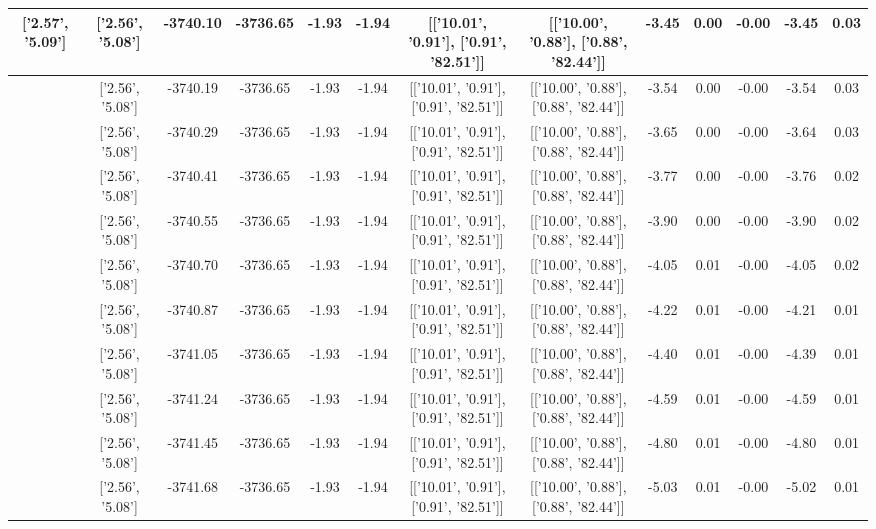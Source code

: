 \begin{table}[htbp]
\begin{adjustbox}{angle=90}
\begin{tabular}{|c|c|c|c|c|c|c|c|c|c|c|c|c|}
 ['2.57', '5.09'] & ['2.56', '5.08'] & -3740.10 & -3736.65 & -1.93 & -1.94 & [['10.01', '0.91'], ['0.91', '82.51']] & [['10.00', '0.88'], ['0.88', '82.44']] & -3.45 & 0.00 & -0.00 & -3.45 & 0.03\\ \hline
 ['2.57', '5.09'] & ['2.56', '5.08'] & -3740.19 & -3736.65 & -1.93 & -1.94 & [['10.01', '0.91'], ['0.91', '82.51']] & [['10.00', '0.88'], ['0.88', '82.44']] & -3.54 & 0.00 & -0.00 & -3.54 & 0.03\\ \hline
 ['2.57', '5.09'] & ['2.56', '5.08'] & -3740.29 & -3736.65 & -1.93 & -1.94 & [['10.01', '0.91'], ['0.91', '82.51']] & [['10.00', '0.88'], ['0.88', '82.44']] & -3.65 & 0.00 & -0.00 & -3.64 & 0.03\\ \hline
 ['2.57', '5.09'] & ['2.56', '5.08'] & -3740.41 & -3736.65 & -1.93 & -1.94 & [['10.01', '0.91'], ['0.91', '82.51']] & [['10.00', '0.88'], ['0.88', '82.44']] & -3.77 & 0.00 & -0.00 & -3.76 & 0.02\\ \hline
 ['2.57', '5.09'] & ['2.56', '5.08'] & -3740.55 & -3736.65 & -1.93 & -1.94 & [['10.01', '0.91'], ['0.91', '82.51']] & [['10.00', '0.88'], ['0.88', '82.44']] & -3.90 & 0.00 & -0.00 & -3.90 & 0.02\\ \hline
 ['2.58', '5.09'] & ['2.56', '5.08'] & -3740.70 & -3736.65 & -1.93 & -1.94 & [['10.01', '0.91'], ['0.91', '82.51']] & [['10.00', '0.88'], ['0.88', '82.44']] & -4.05 & 0.01 & -0.00 & -4.05 & 0.02\\ \hline
 ['2.58', '5.09'] & ['2.56', '5.08'] & -3740.87 & -3736.65 & -1.93 & -1.94 & [['10.01', '0.91'], ['0.91', '82.51']] & [['10.00', '0.88'], ['0.88', '82.44']] & -4.22 & 0.01 & -0.00 & -4.21 & 0.01\\ \hline
 ['2.58', '5.09'] & ['2.56', '5.08'] & -3741.05 & -3736.65 & -1.93 & -1.94 & [['10.01', '0.91'], ['0.91', '82.51']] & [['10.00', '0.88'], ['0.88', '82.44']] & -4.40 & 0.01 & -0.00 & -4.39 & 0.01\\ \hline
 ['2.58', '5.09'] & ['2.56', '5.08'] & -3741.24 & -3736.65 & -1.93 & -1.94 & [['10.01', '0.91'], ['0.91', '82.51']] & [['10.00', '0.88'], ['0.88', '82.44']] & -4.59 & 0.01 & -0.00 & -4.59 & 0.01\\ \hline
 ['2.58', '5.09'] & ['2.56', '5.08'] & -3741.45 & -3736.65 & -1.93 & -1.94 & [['10.01', '0.91'], ['0.91', '82.51']] & [['10.00', '0.88'], ['0.88', '82.44']] & -4.80 & 0.01 & -0.00 & -4.80 & 0.01\\ \hline
 ['2.58', '5.09'] & ['2.56', '5.08'] & -3741.68 & -3736.65 & -1.93 & -1.94 & [['10.01', '0.91'], ['0.91', '82.51']] & [['10.00', '0.88'], ['0.88', '82.44']] & -5.03 & 0.01 & -0.00 & -5.02 & 0.01\\ \hline

\end{tabular}
\end{adjustbox}
\end{table}
